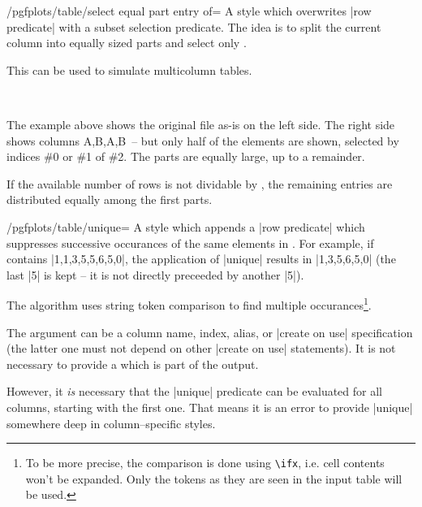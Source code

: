 \begin{stylekey}{/pgfplots/table/select equal part entry of=}
	A style which overwrites |row predicate| with a subset selection predicate. The idea is to split the current column into  equally sized parts and select only .

	This can be used to simulate multicolumn tables.
\begin{codeexample}[]

%
~
\end{codeexample}
	The example above shows the original file as-is on the left side. The right side shows columns A,B,A,B~-- but only half of the elements are shown, selected by indices \#0 or \#1 of \#2. The parts are equally large, up to a remainder. 
	
	If the available number of rows is not dividable by , the remaining entries are distributed equally among the first parts.
\end{stylekey}

\begin{stylekey}{/pgfplots/table/unique=}
	A style which appends a |row predicate| which suppresses successive occurances of the same elements in .
	For example, if  contains |1,1,3,5,5,6,5,0|, the application of |unique| results in |1,3,5,6,5,0| (the last |5| is kept -- it is not directly preceeded by another |5|).

	The algorithm uses string token comparison to find multiple occurances\footnote{To be more precise, the comparison is done using \texttt{\textbackslash ifx}, i.e. cell contents won't be expanded. Only the tokens as they are seen in the input table will be used.}.

	The argument  can be a column name, index, alias, or |create on use| specification (the latter one must not depend on other |create on use| statements). It is not necessary to provide a  which is part of the output.

	However, it \emph{is} necessary that the |unique| predicate can be evaluated for all columns, starting with the first one. That means it is an error to provide |unique| somewhere deep in column--specific styles.
\end{stylekey}

